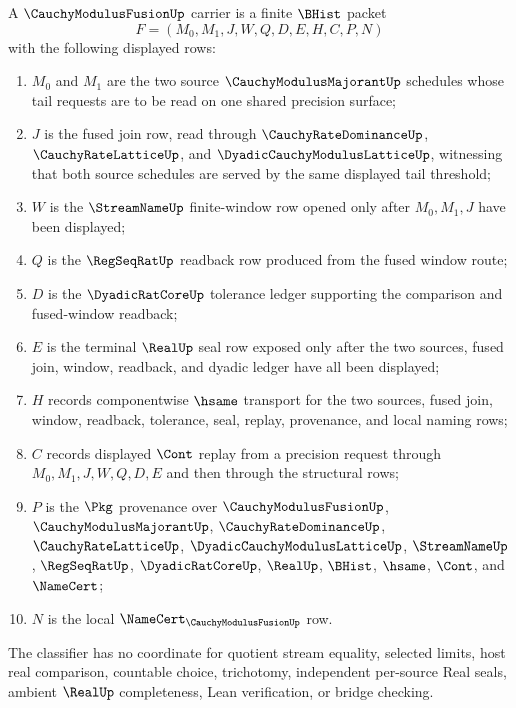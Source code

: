 \begin{definition}
\label{def:cauchy-modulus-fusion-carrier}
A $\CauchyModulusFusionUp$ carrier is a finite $\BHist$ packet
$$
F=(M_0,M_1,J,W,Q,D,E,H,C,P,N)
$$
with the following displayed rows:
\begin{enumerate}
\item $M_0$ and $M_1$ are the two source $\CauchyModulusMajorantUp$ schedules whose tail requests are to be read on one shared precision surface;
\item $J$ is the fused join row, read through $\CauchyRateDominanceUp$, $\CauchyRateLatticeUp$, and $\DyadicCauchyModulusLatticeUp$, witnessing that both source schedules are served by the same displayed tail threshold;
\item $W$ is the $\StreamNameUp$ finite-window row opened only after $M_0,M_1,J$ have been displayed;
\item $Q$ is the $\RegSeqRatUp$ readback row produced from the fused window route;
\item $D$ is the $\DyadicRatCoreUp$ tolerance ledger supporting the comparison and fused-window readback;
\item $E$ is the terminal $\RealUp$ seal row exposed only after the two sources, fused join, window, readback, and dyadic ledger have all been displayed;
\item $H$ records componentwise $\hsame$ transport for the two sources, fused join, window, readback, tolerance, seal, replay, provenance, and local naming rows;
\item $C$ records displayed $\Cont$ replay from a precision request through $M_0,M_1,J,W,Q,D,E$ and then through the structural rows;
\item $P$ is the $\Pkg$ provenance over $\CauchyModulusFusionUp$, $\CauchyModulusMajorantUp$, $\CauchyRateDominanceUp$, $\CauchyRateLatticeUp$, $\DyadicCauchyModulusLatticeUp$, $\StreamNameUp$, $\RegSeqRatUp$, $\DyadicRatCoreUp$, $\RealUp$, $\BHist$, $\hsame$, $\Cont$, and $\NameCert$;
\item $N$ is the local $\NameCert_{\CauchyModulusFusionUp}$ row.
\end{enumerate}
The classifier has no coordinate for quotient stream equality, selected limits, host real comparison, countable choice, trichotomy, independent per-source Real seals, ambient $\RealUp$ completeness, Lean verification, or bridge checking.
\end{definition}

